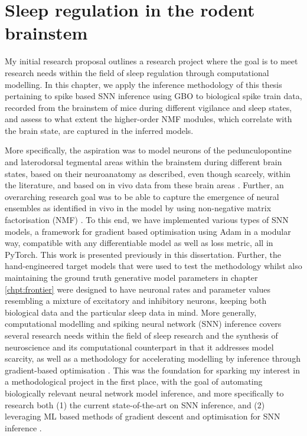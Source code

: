\documentclass[mphil,deptreport,ianc]{infthesis} %
\begin{document}
\chapter{Sleep regulation in the rodent brainstem}\label{chpt:sleep}

My initial research proposal outlines a research project where the goal is to meet research needs within the field of sleep regulation through computational modelling.
In this chapter, we apply the inference methodology of this thesis pertaining to spike based SNN inference using GBO to biological spike train data, recorded from the brainstem of mice during different vigilance and sleep states, and assess to what extent the higher-order NMF modules, which correlate with the brain state, are captured in the inferred models.

More specifically, the aspiration was to model neurons of the pedunculopontine and laterodorsal tegmental areas within the brainstem during different brain states, based on their neuroanatomy as described, even though scarcely, within the literature, and based on in vivo data from these brain areas \cite{Herice2019c, Tsunematsu2019, Pal2007, Martinez-Gonzalez2011, Fraigne2015}.
Further, an overarching research goal was to be able to capture the emergence of neural ensembles as identified in vivo in the model by using non-negative matrix factorisation (NMF) \cite{Seung1999, Seung2001, Onken2016a}.
To this end, we have implemented various types of SNN models, a framework for gradient based optimisation using Adam in a modular way, compatible with any differentiable model as well as loss metric, all in PyTorch. This work is presented previously in this dissertation.
Further, the hand-engineered target models that were used to test the methodology whilst also maintaining the ground truth generative model parameters in chapter \ref{chpt:frontier} were designed to have neuronal rates and parameter values resembling a mixture of excitatory and inhibitory neurons, keeping both biological data and the particular sleep data in mind.
More generally, computational modelling and spiking neural network (SNN) inference covers several research needs within the field of sleep research and the synthesis of neuroscience and its computational counterpart in that it addresses model scarcity, as well as a methodology for accelerating modelling by inference through gradient-based optimisation \cite{Herice2019c, Huh2017, Taherkhani2020}.
This was the foundation for sparking my interest in a methodological project in the first place, with the goal of automating biologically relevant neural network model inference, and more specifically to research both (1) the current state-of-the-art on SNN inference, and (2) leveraging ML based methods of gradient descent and optimisation for SNN inference \cite{Huh2017, Mostafa2020, Tavanaei2019b, Lee2016}.
\end{document}
